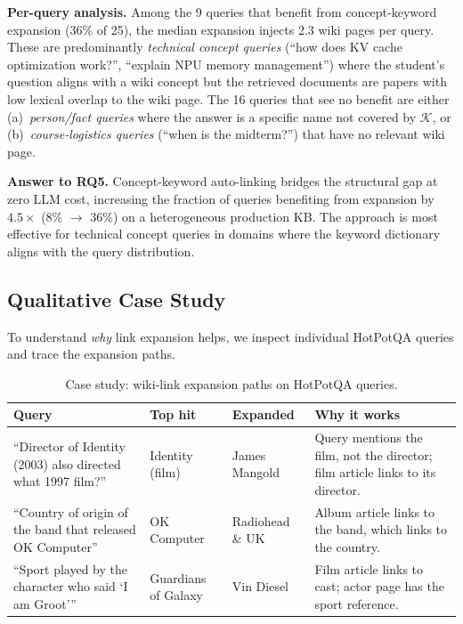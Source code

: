 \documentclass[sigconf,review]{acmart}
\begin{document}
\textbf{Per-query analysis.}
Among the 9 queries that benefit from concept-keyword expansion
(36\% of 25), the median expansion injects 2.3 wiki pages per query.
These are predominantly \emph{technical concept queries}
(``how does KV cache optimization work?'',
``explain NPU memory management'') where the student's question
aligns with a wiki concept but the retrieved documents are papers
with low lexical overlap to the wiki page.
The 16 queries that see no benefit are either (a)~\emph{person/fact
queries} where the answer is a specific name not covered by $\mathcal{K}$,
or (b)~\emph{course-logistics queries} (``when is the midterm?'')
that have no relevant wiki page.

\textbf{Answer to RQ5.}
Concept-keyword auto-linking bridges the structural gap at zero LLM cost,
increasing the fraction of queries benefiting from expansion by $4.5\times$
(8\% $\to$ 36\%) on a heterogeneous production KB.  The approach is
most effective for technical concept queries in domains where the keyword
dictionary aligns with the query distribution.

\subsection{Qualitative Case Study}
\label{sec:casestudy}

To understand \emph{why} link expansion helps, we inspect individual
HotPotQA queries and trace the expansion paths.

\begin{table}[t]
\caption{Case study: wiki-link expansion paths on HotPotQA queries.}
\label{tab:casestudy}
\scriptsize
\hfuzz=15pt
\begin{tabularx}{\columnwidth}{@{}>{\raggedright}p{}>{\raggedright}p{}>{\raggedright}p{}>{\raggedright\arraybackslash}X@{}}
\toprule
\textbf{Query} & \textbf{Top hit} & \textbf{Expanded} & \textbf{Why it works} \\
\midrule
``Director of Identity (2003) also directed what 1997 film?''
  & Identity (film)
  & James Mangold
  & Query mentions the film, not the director; film article links to its director. \\
``Country of origin of the band that released OK Computer''
  & OK Computer
  & Radiohead \& UK
  & Album article links to the band, which links to the country. \\
``Sport played by the character who said `I am Groot'''
  & Guardians of Galaxy
  & Vin Diesel
  & Film article links to cast; actor page has the sport reference. \\
\bottomrule
\end{tabularx}
\end{table}
\end{document}
